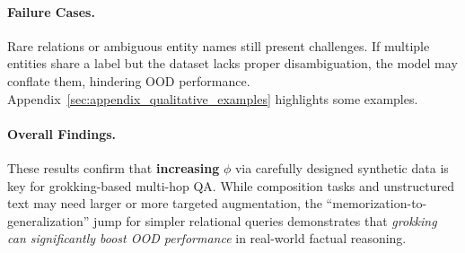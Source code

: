         \paragraph{Failure Cases.}
            Rare relations or ambiguous entity names still present challenges. If multiple entities share a label but 
            the dataset lacks proper disambiguation, the model may conflate them, hindering OOD performance. 
            Appendix~\ref{sec:appendix_qualitative_examples} highlights some examples.
            
        \paragraph{Overall Findings.}
            These results confirm that \textbf{increasing} \(\phi\) via carefully designed synthetic data 
            is key for grokking-based multi-hop QA. 
            While composition tasks and unstructured text may need larger or more targeted augmentation, 
            the “memorization-to-generalization” jump for simpler relational queries demonstrates 
            that \emph{grokking can significantly boost OOD performance} in real-world factual reasoning. 
        
        